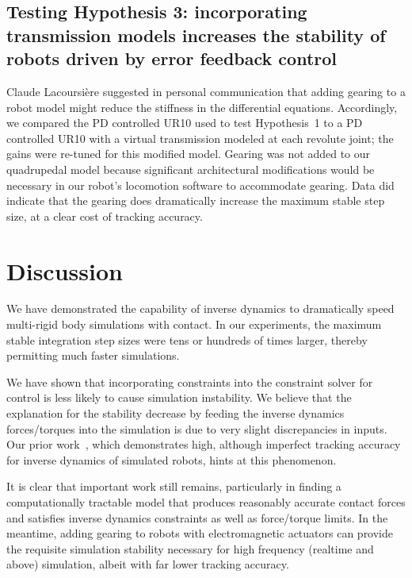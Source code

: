 \documentclass[conference]{IEEEtran}
\begin{document}
\subsection{Testing Hypothesis 3: incorporating transmission models increases the stability of robots driven by error feedback control}
Claude Lacoursi\`{e}re suggested in personal communication that adding gearing to a robot model might reduce the stiffness in the differential equations. Accordingly, we compared the PD controlled UR10 used to test Hypothesis~1 to a PD controlled UR10 with a virtual transmission modeled at each revolute joint; the gains were re-tuned for this modified model.  Gearing was not added to our quadrupedal model because significant architectural modifications would be necessary in our robot's locomotion software to accommodate gearing. Data did indicate that the gearing does dramatically increase the maximum stable step size, at a clear cost of tracking accuracy.

\section{Discussion}

We have demonstrated the capability of inverse dynamics to dramatically speed multi-rigid body simulations with contact.  In our experiments, the maximum stable integration step sizes were tens or hundreds of times larger, thereby permitting much faster simulations.

We have shown that incorporating constraints into the constraint solver for control is less likely to cause simulation instability. We believe that the explanation for the stability decrease by feeding the inverse dynamics forces/torques into the simulation is due to very slight discrepancies in inputs. Our prior work~\cite{Zapolsky:2015c}, which demonstrates high, although imperfect tracking accuracy for inverse dynamics of simulated robots, hints at this phenomenon. 

It is clear that important work still remains, particularly in finding a computationally tractable model that produces reasonably accurate contact forces and satisfies inverse dynamics constraints as well as force/torque limits. In the meantime, adding gearing to robots with electromagnetic actuators can provide the requisite simulation stability necessary for high frequency (realtime and above) simulation, albeit with far lower tracking accuracy.


\end{document}
